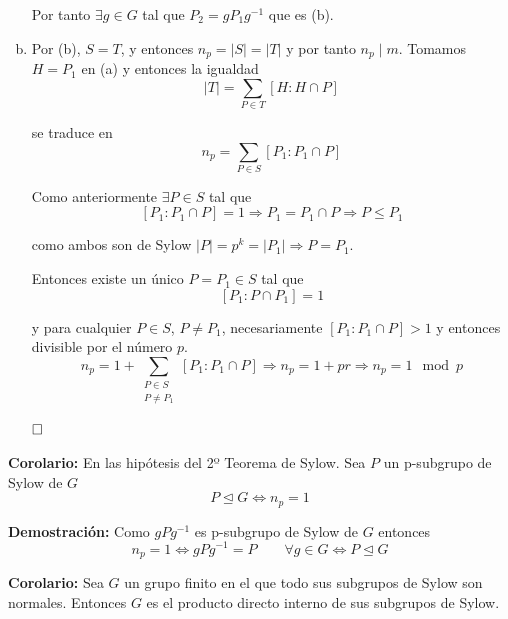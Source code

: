 \documentclass{article}
\begin{document}
\begin{enumerate}[(a)]
Por tanto $\exists g\in G$ tal que $P_2=gP_1g^{-1}$ que es (b).

\item Por (b), $S=T$, y entonces $n_p=|S|=|T|$ y por tanto $n_p\mid m$. Tomamos $H=P_1$ en (a) y entonces la igualdad
\begin{equation*}
|T|=\sum_{P\in T}\left[H:H\cap P\right]
\end{equation*}

se traduce en 
\begin{equation*}
n_p=\sum_{P\in S}\left[P_1:P_1\cap P\right]
\end{equation*}

Como anteriormente $\exists P\in S$ tal que
\begin{equation*}
\left[P_1:P_1\cap P\right]=1\Rightarrow P_1=P_1\cap P\Rightarrow P\leq P_1
\end{equation*}

como ambos son de Sylow $|P|=p^k=|P_1|\Rightarrow P=P_1$.

Entonces existe un único $P=P_1\in S$ tal que
\begin{equation*}
\left[P_1:P\cap P_1\right]=1
\end{equation*}

y para cualquier $P\in S$, $P\neq P_1$, necesariamente $\left[P_1:P_1\cap P\right]>1$ y entonces divisible por el número $p$.
\begin{equation*}
n_p=1+\sum_{\left.\begin{array}{c}
P\in S\\
P\neq P_1
\end{array}\right.}\left[P_1:P_1\cap P\right]\Rightarrow n_p=1+pr\Rightarrow n_p=1\mod{p}
\end{equation*}

$\hfill\square$
\end{enumerate}

\textbf{Corolario:} En las hipótesis del 2º Teorema de Sylow. Sea $P$ un p-subgrupo de Sylow de $G$
\begin{equation*}
P\unlhd G \Leftrightarrow n_p=1
\end{equation*}

\textbf{Demostración:} Como $gPg^{-1}$ es p-subgrupo de Sylow de $G$ entonces
\begin{equation*}
n_p=1\Leftrightarrow gPg^{-1}=P\qquad \forall g\in G\Leftrightarrow P\unlhd G
\end{equation*}

\textbf{Corolario:} Sea $G$ un grupo finito en el que todo sus subgrupos de Sylow son normales. Entonces $G$ es el producto directo interno de sus subgrupos de Sylow. \\
\end{document}
